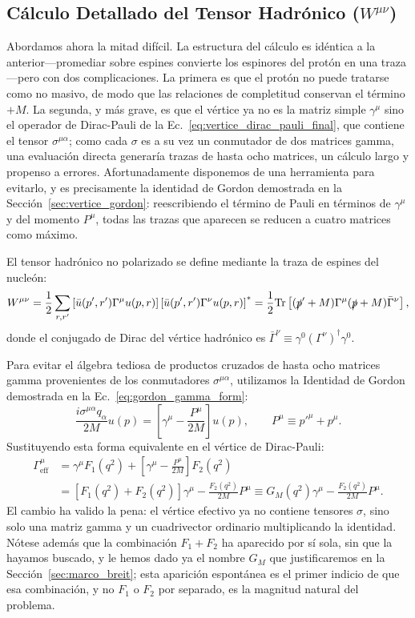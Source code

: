 \documentclass[10pt,a4paper]{article}
\begin{document}
\subsection{Cálculo Detallado del Tensor Hadrónico (\texorpdfstring{$W^{\mu\nu}$}{W\^munu})}
Abordamos ahora la mitad difícil. La estructura del cálculo es idéntica a la anterior---promediar sobre espines convierte los espinores del protón en una traza---pero con dos complicaciones. La primera es que el protón no puede tratarse como no masivo, de modo que las relaciones de completitud conservan el término $+M$. La segunda, y más grave, es que el vértice ya no es la matriz simple $\gamma^\mu$ sino el operador de Dirac-Pauli de la Ec.~\eqref{eq:vertice_dirac_pauli_final}, que contiene el tensor $\sigma^{\mu\alpha}$; como cada $\sigma$ es a su vez un conmutador de dos matrices gamma, una evaluación directa generaría trazas de hasta ocho matrices, un cálculo largo y propenso a errores. Afortunadamente disponemos de una herramienta para evitarlo, y es precisamente la identidad de Gordon demostrada en la Sección~\ref{sec:vertice_gordon}: reescribiendo el término de Pauli en términos de $\gamma^\mu$ y del momento $P^\mu$, todas las trazas que aparecen se reducen a cuatro matrices como máximo.

El tensor hadrónico no polarizado se define mediante la traza de espines del nucleón:
\begin{equation}
W^{\mu\nu} = \frac{1}{2} \sum_{r, r'} \left[ \bar{u}(p', r') \Gamma^\mu u(p, r) \right] \left[ \bar{u}(p', r') \Gamma^\nu u(p, r) \right]^* = \frac{1}{2} \text{Tr} \left[ (\slashed{p}' + M) \Gamma^\mu (\slashed{p} + M) \bar{\Gamma}^\nu \right],
\end{equation}
donde el conjugado de Dirac del vértice hadrónico es $\bar{\Gamma}^\nu \equiv \gamma^0 (\Gamma^\nu)^\dagger \gamma^0$.

Para evitar el álgebra tediosa de productos cruzados de hasta ocho matrices gamma provenientes de los conmutadores $\sigma^{\mu\alpha}$, utilizamos la Identidad de Gordon demostrada en la Ec.~\eqref{eq:gordon_gamma_form}:
\begin{equation}
\frac{i\sigma^{\mu\alpha} q_\alpha}{2M} u(p) = \left[ \gamma^\mu - \frac{P^\mu}{2M} \right] u(p), \qquad P^\mu \equiv p'^\mu + p^\mu.
\end{equation}
Sustituyendo esta forma equivalente en el vértice de Dirac-Pauli:
\begin{align}
\Gamma^\mu_{\text{eff}} &= \gamma^\mu F_1(q^2) + \left[ \gamma^\mu - \frac{P^\mu}{2M} \right] F_2(q^2) \nonumber \\
&= [F_1(q^2) + F_2(q^2)] \gamma^\mu - \frac{F_2(q^2)}{2M} P^\mu \equiv G_M(q^2) \gamma^\mu - \frac{F_2(q^2)}{2M} P^\mu.
\label{eq:gamma_eff}
\end{align}
El cambio ha valido la pena: el vértice efectivo ya no contiene tensores $\sigma$, sino solo una matriz gamma y un cuadrivector ordinario multiplicando la identidad. Nótese además que la combinación $F_1 + F_2$ ha aparecido por sí sola, sin que la hayamos buscado, y le hemos dado ya el nombre $G_M$ que justificaremos en la Sección~\ref{sec:marco_breit}; esta aparición espontánea es el primer indicio de que esa combinación, y no $F_1$ o $F_2$ por separado, es la magnitud natural del problema.
\end{document}
